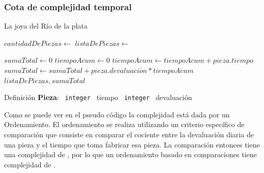 \documentclass[11pt, a4paper, twoside]{article}
\begin{document}
\subsubsection{Cota de complejidad temporal}

\begin{algorithm}
\caption{La joya del Río de la plata}\label{alg:joyarioplata}
\footnotesize\begin{algorithmic}[1]
	\Require
		\Statex $cantidadDePiezas \gets$  
		\Statex $listaDePiezas \gets$  
	\Ensure
		\Statex {} 
	\Statex
	
  \State $sumaTotal \gets 0$ 
  \State $tiempoAcum \gets 0$ 
  \State {} 
   
    \State $tiempoAcum \gets tiempoAcum + pieza.tiempo$ 
    \State $sumaTotal \gets sumaTotal + pieza.devaluaci\acute{o}n * tiempoAcum $ 
    \EndFor {}
  \State \Return $listaDePiezas, sumaTotal$
  \State

  \Statex{}
   
   
    \State {} 
  \Else
    \State {}
  \EndIf
	\EndFunction {}
  \State

  \Statex
  \State Definición \textbf{Pieza}:
  \State \texttt{ integer } tiempo 
  \State \texttt{ integer } devaluación 
	\Statex{}
	
\end{algorithmic}
\end{algorithm}



  Como se puede ver en el pseudo código la complejidad está dada por un Ordenamiento.
El ordenamiento se realiza utilizando un criterio específico de comparación que consiste
en comparar el cociente entre la devaluación diaria de una pieza y el tiempo que toma
fabricar esa pieza. La comparación entonces tiene una complejidad de , por lo que
un ordenamiento basado en comparaciones tiene complejidad de .
\end{document}
